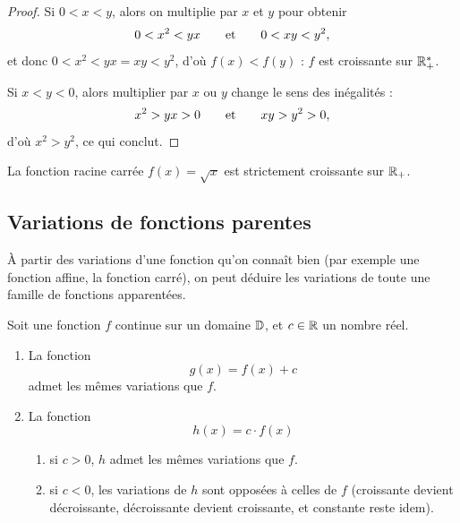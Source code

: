 \documentclass[a4paper, 12pt]{report}
\begin{document}
\begin{proof}
	Si $0 < x < y$, alors on multiplie par $x$ et $y$ pour obtenir
		\begin{align*}
			0 < x^2 < yx && \quad \text{et} \quad && 0 < xy < y^2,
		\end{align*}
	et donc $0 < x^2 < yx = xy < y^2$, d'où $f(x) < f(y)$ : $f$ est croissante sur $\mathbb{R}_+^*$.
	
	Si $x < y < 0$, alors multiplier par $x$ ou $y$ change le sens des inégalités :
		\begin{align*}
			x^2 > yx > 0 && \quad \text{et} \quad && xy > y^2 > 0,
		\end{align*}
	d'où $x^2 > y^2$, ce qui conclut.
\end{proof}

\begin{thm}
	La fonction racine carrée $f(x) = \sqrt{x}$ est strictement croissante sur $\mathbb{R}_+$.
\end{thm}

\subsection{Variations de fonctions parentes}

À partir des variations d'une fonction qu'on connaît bien (par exemple une fonction affine, la fonction carré), on peut déduire les variations de toute une famille de fonctions apparentées.

\begin{thm}
	Soit une fonction $f$ continue sur un domaine $\mathbb{D}$, et $c\in\mathbb{R}$ un nombre réel.
		\begin{enumerate}
			\item La fonction
				\[ g(x) = f(x) + c \]
			admet les mêmes variations que $f$.
			\item La fonction
				\[ h(x) = c \cdot f(x) \]
				\begin{enumerate}[label=(\roman*)]
					\item si $c>0$, $h$ admet les mêmes variations que $f$.
					\item si $c<0$, les variations de $h$ sont opposées à celles de $f$ (croissante devient décroissante, décroissante devient croissante, et constante reste idem).
				\end{enumerate}
		\end{enumerate}
\end{thm}
\end{document}
